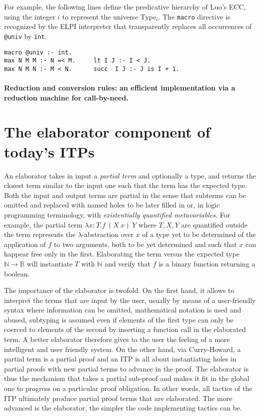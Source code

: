 \documentclass{easychair}
\begin{document}
For example, the following lines define the predicative hierarchy of Luo's ECC,
using the integer $i$ to represent the universe Type$_i$. The \verb+macro+
directive is recognized by the ELPI interpreter that transparently replaces all
occurrences of \verb+@univ+ by \verb+int+.
\begin{Verbatim}
macro @univ :- int.
max N M M :- N =< M.     lt I J :- I < J.
max N M N :- M < N.      succ  I J :- J is I + 1.
\end{Verbatim}

\paragraph{Reduction and conversion rules: an efficient implementation via a reduction machine for call-by-need.}\label{sec:kernelmachine}



\section{The elaborator component of today's ITPs}\label{sec:elaborator}

An elaborator takes in input a \emph{partial term} and optionally a
type, and returns the closest term similar to the input one such that
the term has the expected type. Both the input and output terms are
partial in the sense that subterms can be omitted and replaced with
named holes to be later filled in or, in logic programming
terminology, with \emph{existentially quantified metavariables}. For
example, the partial term $\lambda x: T. f~(X~x)~Y$ where $T,X,Y$ are
quantified outside the term represents the $\lambda$-abstraction over
$x$ of a type yet to be determined of the application of $f$ to two
arguments, both to be yet determined and such that $x$ can happear
free only in the first. Elaborating the term versus the expected type
$\mathbb{N} \to \mathbb{B}$ will instantiate $T$ with $\mathbb{N}$ and
verify that $f$ is a binary function returning a boolean.

The importance of the elaborator is twofold. On the first hand, it
allows to interpret the terms that are input by the user, usually by
means of a user-friendly syntax where information can be omitted,
mathematical notation is used and abused, subtyping is assumed even if
elements of the first type can only be coerced to elements of the
second by inserting a function call in the elaborated term. A better
elaborator therefore gives to the user the feeling of a more
intelligent and user friendly system. On the other hand, via
Curry-Howard, a partial term is a partial proof and an ITP is all
about instantiating holes in partial proofs with new partial terms to
advance in the proof. The elaborator is thus the mechanism that takes
a partial sub-proof and makes it fit in the global one to progress on
a particular proof obligation. In other words, all tactics of the ITP
ultimately produce partial proof terms that are elaborated. The more
advanced is the elaborator, the simpler the code implementing tactics
can be.
\end{document}
